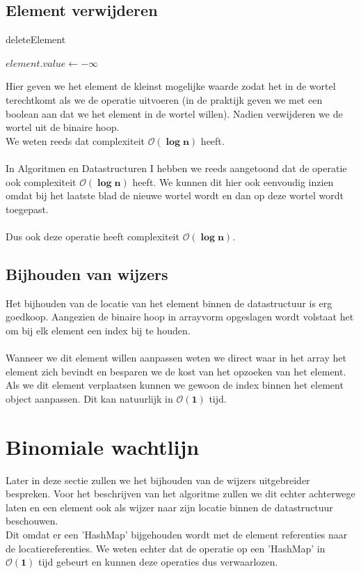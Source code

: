 \documentclass[a4paper,12pt]{report}
\newcommand{\bigO}[1]{$\bm{\mathcal{O}(#1)}$} %
\begin{document}
\subsection{Element verwijderen}
\begin{algorithm}[H]
\caption{deleteElement}
\SetAlgoLined	
\DontPrintSemicolon
$element.value \gets -\infty$\;
\;	
\;
\end{algorithm}
Hier geven we het element de kleinst mogelijke waarde zodat het in de wortel terechtkomt als we de  operatie uitvoeren (in de praktijk geven we met een boolean aan dat we het element in de wortel willen). Nadien verwijderen we de wortel uit de binaire hoop. \\
We weten reeds dat  complexiteit \bigO{\log n} heeft. \\ \\
In Algoritmen en Datastructuren I hebben we reeds aangetoond dat de  operatie ook complexiteit \bigO{\log n} heeft. We kunnen dit hier ook eenvoudig inzien omdat bij  het laatste blad de nieuwe wortel wordt en dan  op deze wortel wordt toegepast. \\ \\
Dus ook deze operatie heeft complexiteit \bigO{\log n}.
\subsection{Bijhouden van wijzers}
Het bijhouden van de locatie van het element binnen de datastructuur is erg goedkoop. Aangezien de binaire hoop in arrayvorm opgeslagen wordt volstaat het om bij elk element een index bij te houden. \\ \\
Wanneer we dit element willen aanpassen weten we direct waar in het array het element zich bevindt en besparen we de kost van het opzoeken van het element. Als we dit element verplaatsen kunnen we gewoon de index binnen het element object aanpassen. Dit kan natuurlijk in \bigO{1} tijd. 

\newpage
\section{Binomiale wachtlijn} %
Later in deze sectie zullen we het bijhouden van de wijzers uitgebreider bespreken. Voor het beschrijven van het algoritme zullen we dit echter achterwege laten en een element ook als wijzer naar zijn locatie binnen de datastructuur beschouwen. \\
Dit omdat er een 'HashMap' bijgehouden wordt met de element referenties naar de locatiereferenties. We weten echter dat de  operatie op een 'HashMap' in \bigO{1} tijd gebeurt en kunnen deze operaties dus verwaarlozen.
\end{document}
